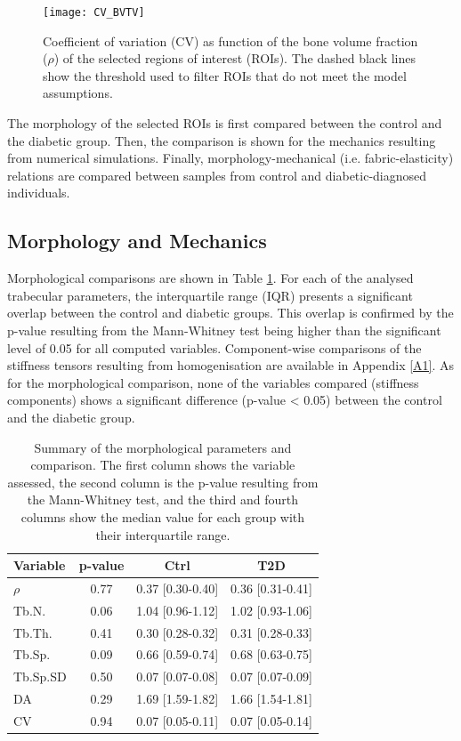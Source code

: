 \documentclass[a4paper,fleqn]{DC_ArtStyle}
\begin{document}
	\begin{figure}
		\centering
		\texttt{[image: CV\_BVTV]}
		\caption{Coefficient of variation (CV) as function of the bone volume fraction ($\rho$) of the selected regions of interest (ROIs).
				 The dashed black lines show the threshold used to filter ROIs that do not meet the model assumptions.}
		\label{FigCVBVTV}
	\end{figure}

	The morphology of the selected ROIs is first compared between the control and the diabetic group.
	Then, the comparison is shown for the mechanics resulting from numerical simulations.
	Finally, morphology-mechanical (i.e. fabric-elasticity) relations are compared between samples from control and diabetic-diagnosed individuals.
   
	\subsection{Morphology and Mechanics}
	Morphological comparisons are shown in Table \ref{TabMorph}.
	For each of the analysed trabecular parameters, the interquartile range (IQR) presents a significant overlap between the control and diabetic groups.
	This overlap is confirmed by the p-value resulting from the Mann-Whitney test being higher than the significant level of 0.05 for all computed variables.
	Component-wise comparisons of the stiffness tensors resulting from homogenisation are available in Appendix \ref{A1}.
	As for the morphological comparison, none of the variables compared (stiffness components) shows a significant difference (p-value < 0.05) between the control and the diabetic group.
   
	\begin{table}[h!]
		\centering
		\caption{Summary of the morphological parameters and comparison.
				 The first column shows the variable assessed, the second column is the p-value resulting from the Mann-Whitney test, and the third and fourth columns show the median value for each group with their interquartile range.}
		\begin{tabular}{l|ccc}
			Variable & p-value & Ctrl & T2D \\\hline
			$\rho$ & 0.77 & 0.37 [0.30-0.40] & 0.36 [0.31-0.41] \\
			Tb.N. & 0.06 & 1.04 [0.96-1.12] & 1.02 [0.93-1.06] \\
			Tb.Th. &  0.41 & 0.30 [0.28-0.32] & 0.31 [0.28-0.33] \\
			Tb.Sp. & 0.09 & 0.66 [0.59-0.74] & 0.68 [0.63-0.75] \\
			Tb.Sp.SD & 0.50 & 0.07 [0.07-0.08] & 0.07 [0.07-0.09] \\
			DA & 0.29 & 1.69 [1.59-1.82] & 1.66 [1.54-1.81] \\
			CV & 0.94 & 0.07 [0.05-0.11] & 0.07 [0.05-0.14] \\
		\end{tabular}
		\label{TabMorph}
	\end{table}
\end{document}
